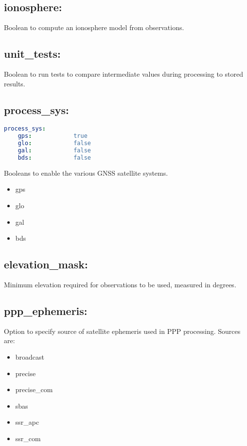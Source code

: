 \subsection*{ionosphere:}
Boolean to compute an ionosphere model from observations.

\subsection*{unit\_tests:}
Boolean to run tests to compare intermediate values during processing to stored results.


\subsection*{process\_sys:}
\begin{lstlisting}[language=yaml,caption=process\_sys:]
process_sys:
    gps:            true
    glo:            false
    gal:            false
    bds:            false
\end{lstlisting}

Booleans to enable the various GNSS satellite systems.

\begin{itemize}
\item gps
\item glo
\item gal
\item bds
\end{itemize}

\subsection*{elevation\_mask:}
Minimum elevation required for observations to be used, measured in degrees.

\subsection*{ppp\_ephemeris:}
Option to specify source of satellite ephemeris used in PPP processing. Sources are:
\begin{itemize}
\item broadcast
\item precise
\item precise\_com
\item sbas
\item ssr\_apc
\item ssr\_com
\end{itemize}

